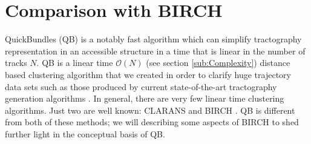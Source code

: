 \documentclass[journal]{IEEEtran}
\begin{document}

\section{Comparison with BIRCH\label{sub:BIRCH}}

QuickBundles (QB) is a notably fast algorithm which can simplify
tractography representation in an accessible structure in a time that is
linear in the number of tracks $N$. QB is a linear time $\mathcal{O}(N)$ (see
section \ref{sub:Complexity}) distance based clustering algorithm that
we created in order to clarify huge trajectory data sets such as those
produced by current state-of-the-art tractography generation algorithms
\cite{Parker2003,WWS+08}. In general, there are very few linear time
clustering algorithms. Just two are well known: CLARANS
\cite{ng2002clarans} and BIRCH \cite{zhang1997birch}. QB is different
from both of these methods; we will describing some
aspects of BIRCH to shed further light in the conceptual basis of QB.
\end{document}
